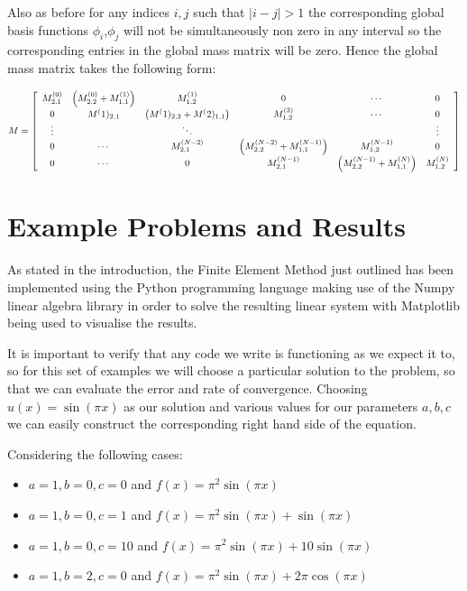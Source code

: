 Also as before for any indices $i,j$ such that $|i - j| > 1$ the corresponding
global basis functions $\phi_i$,$\phi_j$ will not be simultaneously non zero in
any interval so the corresponding entries in the global mass matrix will be
zero. Hence the global mass matrix takes the following form:

\begin{equation}\label{eq:oned-deterministic-global-mass}
    M = \left[\begin{array}{c c c c c c}
            M^{(0)}_{2,1} & \left(M^{(0)}_{2,2} + M^{(1)}_{1,1}\right) & M^{(1)}_{1,2} & 0 & \cdots & 0 \\
            0 & M^(1)_{2,1} & \left(M^(1)_{2,2} + M^(2)_{1,1}\right) & M^{(2)}_{1,2} & \cdots & 0 \\
            \vdots & & \ddots & & & \vdots \\
            0 & \cdots & M^{(N-2)}_{2,1} & \left(M^{(N-2)}_{2,2} + M^{(N-1)}_{1,1}\right) & M^{(N-1)}_{1,2} & 0  \\
            0 &\cdots & 0 & M^{(N-1)}_{2,1} & \left(M^{(N-1)}_{2,2} + M^{(N)}_{1,1}\right) & M^{(N)}_{1,2}
        \end{array}\right]
\end{equation}


\section{Example Problems and Results}

As stated in the introduction, the Finite Element Method just outlined has been
implemented using the Python programming language making use of the Numpy
linear algebra library \cite{numpy-array} in order to solve the resulting
linear system  with Matplotlib
\cite{matplotlib} being used to visualise the results.

It is important to verify that any code we write is functioning as we expect it
to, so for this set of examples we will choose a particular solution to the
problem, so that we can evaluate the error and rate of convergence. Choosing
$u(x) = \sin{(\pi x)}$ as our solution and various values for our parameters
$a,b,c$ we can easily construct the corresponding right hand side of the
equation.

Considering the following cases:
\begin{itemize}
    \item $a = 1, b = 0, c = 0$ and
          $f(x) = \pi^2\sin{(\pi x)}$
    \item $a = 1, b = 0, c = 1$ and
          $f(x) = \pi^2\sin{(\pi x)} + \sin{(\pi x)}$
    \item $a = 1, b = 0, c = 10$ and
          $f(x) = \pi^2\sin{(\pi x)} + 10\sin{(\pi x)}$
    \item $a = 1, b = 2, c = 0$ and
          $f(x) = \pi^2\sin{(\pi x)} + 2\pi\cos{(\pi x)}$
\end{itemize}

